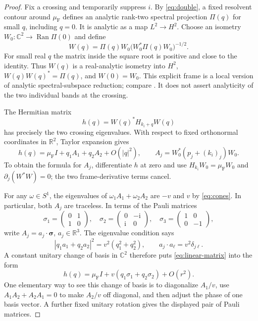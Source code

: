 \documentclass[11pt,a4paper]{article}
\numberwithin{equation}{section}
\newcommand{\R}{\mathbb R}
\newcommand{\C}{\mathbb C}
\newcommand{\ii}{\mathrm i}
\DeclareMathOperator{\Ran}{Ran}
\theoremstyle{remark}
\begin{document}
\begin{proof}
Fix a crossing and temporarily suppress $i$. By \eqref{eq:double},
a fixed resolvent contour around $\mu_{\mathrm F}$ defines an analytic
rank-two spectral projection $\Pi(q)$ for small $q$, including $q=0$.
It is analytic as a map $L^2\to H^2$. Choose an isometry
$W_0:\C^2\to\Ran\Pi(0)$ and define
\begin{equation}\label{eq:frame}
 W(q)=\Pi(q)W_0\bigl(W_0^*\Pi(q)W_0\bigr)^{-1/2}.
\end{equation}
For small real $q$ the matrix inside the square root is positive and
close to the identity. Thus $W(q)$ is a real-analytic isometry into
$H^2$, $W(q)W(q)^*=\Pi(q)$, and $W(0)=W_0$.
This explicit frame is a local version of analytic spectral-subspace
reduction; compare \cite[Theorem XII.12]{RS4}. It does not assert
analyticity of the two individual bands at the crossing.

The Hermitian matrix
\[
 h(q)=W(q)^*H_{k_i+q}W(q)
\]
has precisely the two crossing eigenvalues. With respect to fixed
orthonormal coordinates in $\R^2$, Taylor expansion gives
\begin{equation}\label{eq:linear-matrix}
 h(q)=\mu_{\mathrm F}I+q_1A_1+q_2A_2+O(|q|^2),\qquad
 A_j=W_0^*(p_j+(k_i)_j)W_0.
\end{equation}
To obtain the formula for $A_j$, differentiate $h$ at zero and use
$H_{k_i}W_0=\mu_{\mathrm F}W_0$ and
$\partial_j(W^*W)=0$; the two frame-derivative terms cancel.

For any $\omega\in S^1$, the eigenvalues of
$\omega_1A_1+\omega_2A_2$ are $-v$ and $v$ by \eqref{eq:cones}.
In particular, both $A_j$ are traceless. In terms of the Pauli matrices
\[
 \sigma_1=\begin{pmatrix}0&1\\1&0\end{pmatrix},\quad
 \sigma_2=\begin{pmatrix}0&-\ii\\\ii&0\end{pmatrix},\quad
 \sigma_3=\begin{pmatrix}1&0\\0&-1\end{pmatrix},
\]
write $A_j=a_j\cdot\boldsymbol\sigma$, $a_j\in\R^3$.
The eigenvalue condition says
\[
 |q_1a_1+q_2a_2|^2=v^2(q_1^2+q_2^2),\qquad
 a_j\cdot a_\ell=v^2\delta_{j\ell}.
\]
A constant unitary change of basis in $\C^2$ therefore puts
\eqref{eq:linear-matrix} into the form
\begin{equation}\label{eq:dirac-matrix}
 h(q)=\mu_{\mathrm F}I+v(q_1\sigma_1+q_2\sigma_2)+O(r^2).
\end{equation}
One elementary way to see this change of basis is to diagonalize
$A_1/v$, use $A_1A_2+A_2A_1=0$ to make $A_2/v$ off diagonal, and then
adjust the phase of one basis vector. A further fixed unitary rotation
gives the displayed pair of Pauli matrices.


\end{proof}
\end{document}
